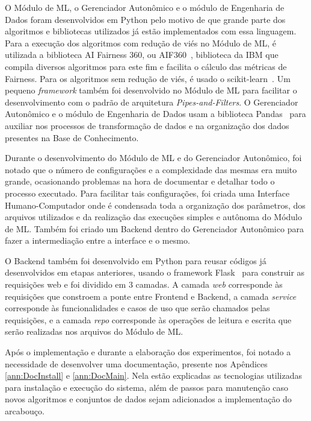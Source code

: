 \documentclass[portugues]{ic-tese}
\begin{document}
O Módulo de ML, o Gerenciador Autonômico e o módulo de Engenharia de Dados foram desenvolvidos em Python pelo motivo de que grande parte dos algoritmos e bibliotecas utilizados já estão implementados com essa linguagem. Para a execução dos algoritmos com redução de viés no Módulo de ML, é utilizada a biblioteca AI Fairness 360, ou AIF360~\citep{AIF360_2022}, biblioteca da IBM que compila diversos algoritmos para este fim e facilita o cálculo das métricas de Fairness. Para os algoritmos sem redução de viés, é usado o scikit-learn~\citep{scikit_2022}. Um pequeno \textit{framework} também foi desenvolvido no Módulo de ML para facilitar o desenvolvimento com o padrão de arquitetura \textit{Pipes-and-Filters}. O Gerenciador Autonômico e o módulo de Engenharia de Dados usam a biblioteca Pandas~\citep{Pandas_2023} para auxiliar nos processos de transformação de dados e na organização dos dados presentes na Base de Conhecimento.

Durante o desenvolvimento do Módulo de ML e do Gerenciador Autonômico, foi notado que o número de configurações e a complexidade das mesmas era muito grande, ocasionando problemas na hora de documentar e detalhar todo o processo executado. Para facilitar tais configurações, foi criada uma Interface Humano-Computador onde é condensada toda a organização dos parâmetros, dos arquivos utilizados e da realização das execuções simples e autônoma do Módulo de ML. Também foi criado um Backend dentro do Gerenciador Autonômico para fazer a intermediação entre a interface e o mesmo.

O Backend também foi desenvolvido em Python para reusar códigos já desenvolvidos em etapas anteriores, usando o framework Flask~\citep{Flask_2023} para construir as requisições web e foi dividido em 3 camadas. A camada \textit{web} corresponde às requisições que constroem a ponte entre Frontend e Backend, a camada \textit{service} corresponde às funcionalidades e casos de uso que serão chamados pelas requisições, e a camada \textit{repo} corresponde às operações de leitura e escrita que serão realizadas nos arquivos do Módulo de ML.

Após o implementação e durante a elaboração dos experimentos, foi notado a necessidade de desenvolver uma documentação, presente nos Apêndices \ref{ann:DocInstall} e \ref{ann:DocMain}. Nela estão explicadas as tecnologias utilizadas para instalação e execução do sistema, além de passos para manutenção caso novos algoritmos e conjuntos de dados sejam adicionados a implementação do arcabouço.
\end{document}
